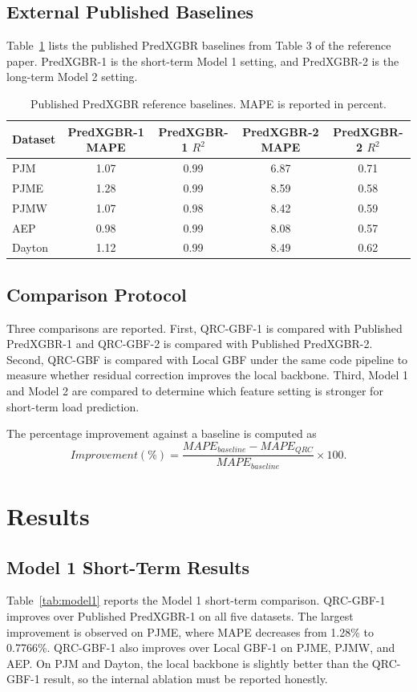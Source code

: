 \documentclass[11pt]{article}
\begin{document}
\subsection{External Published Baselines}
Table~\ref{tab:published} lists the published PredXGBR baselines from Table 3 of the reference paper. PredXGBR-1 is the short-term Model 1 setting, and PredXGBR-2 is the long-term Model 2 setting.

\begin{table}[H]
\centering
\caption{Published PredXGBR reference baselines. MAPE is reported in percent.}
\label{tab:published}
\begin{tabular}{lcccc}
\toprule
Dataset & PredXGBR-1 MAPE & PredXGBR-1 $R^2$ & PredXGBR-2 MAPE & PredXGBR-2 $R^2$ \\
\midrule
PJM & 1.07 & 0.99 & 6.87 & 0.71 \\
PJME & 1.28 & 0.99 & 8.59 & 0.58 \\
PJMW & 1.07 & 0.98 & 8.42 & 0.59 \\
AEP & 0.98 & 0.99 & 8.08 & 0.57 \\
Dayton & 1.12 & 0.99 & 8.49 & 0.62 \\
\bottomrule
\end{tabular}
\end{table}

\subsection{Comparison Protocol}
Three comparisons are reported. First, QRC-GBF-1 is compared with Published PredXGBR-1 and QRC-GBF-2 is compared with Published PredXGBR-2. Second, QRC-GBF is compared with Local GBF under the same code pipeline to measure whether residual correction improves the local backbone. Third, Model 1 and Model 2 are compared to determine which feature setting is stronger for short-term load prediction.

The percentage improvement against a baseline is computed as
\begin{equation}
Improvement(\%) = \frac{MAPE_{baseline} - MAPE_{QRC}}{MAPE_{baseline}} \times 100.
\end{equation}

\section{Results}
\subsection{Model 1 Short-Term Results}
Table~\ref{tab:model1} reports the Model 1 short-term comparison. QRC-GBF-1 improves over Published PredXGBR-1 on all five datasets. The largest improvement is observed on PJME, where MAPE decreases from 1.28\% to 0.7766\%. QRC-GBF-1 also improves over Local GBF-1 on PJME, PJMW, and AEP. On PJM and Dayton, the local backbone is slightly better than the QRC-GBF-1 result, so the internal ablation must be reported honestly.
\end{document}
